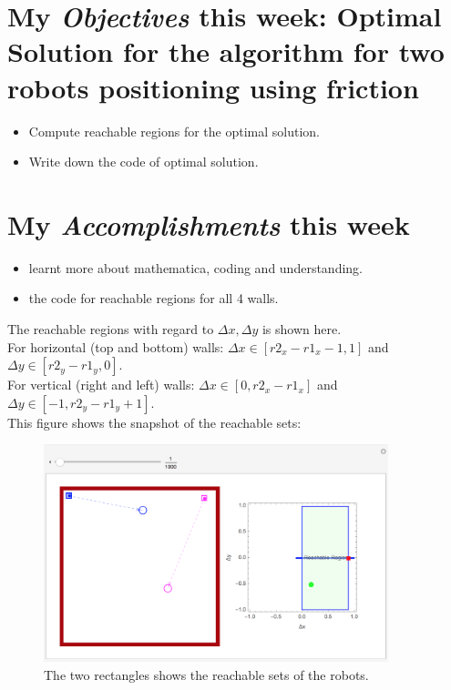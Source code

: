\newcommand{\handoutName}{Weekly report}
\newcommand{\handoutdate}{\today}


\section{My \emph{Objectives} this week: Optimal Solution for the algorithm for two robots positioning using friction}
\begin{itemize}
\item Compute reachable regions for the optimal solution.
\item Write down the code of optimal solution.
\end{itemize}



\section{My \emph{Accomplishments} this week}


\begin{itemize}
\item learnt more about mathematica, coding and understanding.
\item the code for reachable regions for all 4 walls.
\end{itemize}
The reachable regions with regard to $\Delta x ,\Delta y$ is shown here. \\
For horizontal (top and bottom) walls: $\Delta x \in [r2_x - r1_x -1 , 1]$ and $\Delta y \in [r2_y - r1_y , 0]$.\\
For vertical (right and left) walls: $\Delta x \in [0 , r2_x - r1_x]$ and $\Delta y \in [-1 , r2_y - r1_y +1]$.\\
This figure shows the snapshot of the reachable sets:
\begin{figure}[h]
\begin{center}
\includegraphics[width=10cm]{ReachableSet.png}
\caption{The two rectangles shows the reachable sets of the robots.}
\end{center}
\end{figure}


